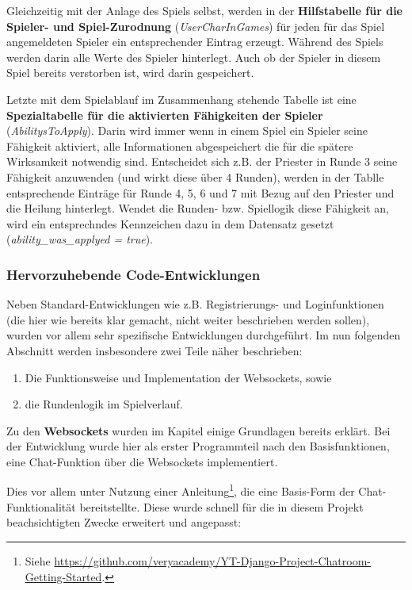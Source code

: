 Gleichzeitig mit der Anlage des Spiels selbst, werden in der \textbf{Hilfstabelle für die Spieler- und Spiel-Zurodnung} (\textit{UserCharInGames}) für jeden für das Spiel angemeldeten Spieler ein entsprechender Eintrag erzeugt. Während des Spiels werden darin alle Werte des Spieler hinterlegt. Auch ob der Spieler in diesem Spiel bereits verstorben ist, wird darin gespeichert. 

Letzte mit dem Spielablauf im Zusammenhang stehende Tabelle ist eine \textbf{Spezialtabelle für die aktivierten Fähigkeiten der Spieler} (\textit{AbilitysToApply}). Darin wird immer wenn in einem Spiel ein Spieler seine Fähigkeit aktiviert, alle Informationen abgespeichert die für die spätere Wirksamkeit notwendig sind. Entscheidet sich z.B. der Priester in Runde 3 seine Fähigkeit anzuwenden (und wirkt diese über 4 Runden), werden in der Tablle entsprechende Einträge für Runde 4, 5, 6 und 7 mit Bezug auf den Priester und die Heilung hinterlegt. Wendet die Runden- bzw. Spiellogik diese Fähigkeit an, wird ein entsprechndes Kennzeichen dazu in dem Datensatz gesetzt (\textit{ability\_was\_applyed = true}).





\subsubsection{Hervorzuhebende Code-Entwicklungen}


Neben Standard-Entwicklungen wie z.B. Registrierungs- und Loginfunktionen (die hier wie bereits klar gemacht, nicht weiter beschrieben werden sollen), wurden vor allem sehr spezifische Entwicklungen durchgeführt. Im nun folgenden Abschnitt werden insbesondere zwei Teile näher beschrieben: 

\begin{enumerate}
    \item Die Funktionsweise und Implementation der Websockets, sowie 
    \item die Rundenlogik im Spielverlauf.
\end{enumerate}



Zu den \textbf{Websockets} wurden im Kapitel  einige Grundlagen bereits erklärt. Bei der Entwicklung wurde hier als erster Programmteil nach den Basisfunktionen, eine Chat-Funktion über die Websockets implementiert. 


Dies vor allem unter Nutzung einer Anleitung\footnote{Siehe \url{https://github.com/veryacademy/YT-Django-Project-Chatroom-Getting-Started}.}, die eine Basis-Form der Chat-Funktionalität bereitstellte. Diese wurde schnell für die in diesem Projekt beachsichtigten Zwecke erweitert und angepasst:

